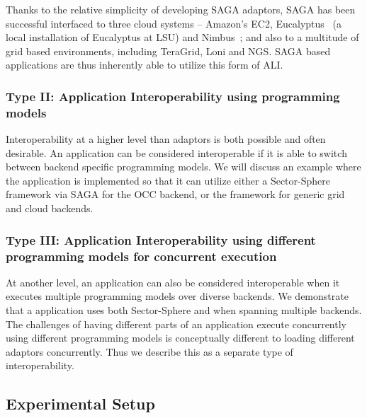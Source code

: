 \documentclass[3p,twocolumn]{elsarticle}
\begin{document}

Thanks to the relative simplicity of developing SAGA adaptors, SAGA
has been successful interfaced to three cloud systems -- Amazon's EC2,
Eucalyptus~\cite{eucalyptus} (a local installation of Eucalyptus at
LSU) and Nimbus~\cite{nimbus}; and also to a multitude of grid based
environments, including TeraGrid, Loni and NGS.  SAGA based
applications are thus inherently able to utilize this form of ALI.

\subsubsection{Type II: Application Interoperability using programming
  models} %
%
%

Interoperability at a higher level than adaptors is both possible and
often desirable. An application can be considered interoperable if it
is able to switch between backend specific programming models.  We
will discuss an example where the \wc application is implemented so
that it can utilize either a Sector-Sphere framework via SAGA for the
OCC backend, or the \smr framework for generic grid and cloud
backends.

\subsubsection{Type III: Application Interoperability using different
  programming models for concurrent execution}
%
%

At another level, an application can also be considered interoperable
when it executes multiple programming models  over
diverse backends.  We demonstrate that a \wc application uses both
Sector-Sphere and \smr when spanning  multiple backends.  The
challenges of having different parts of an application execute
concurrently using different programming models is conceptually
different to loading different adaptors concurrently. Thus we describe
this as a separate type of interoperability.

\subsection{Experimental Setup}
\end{document}

